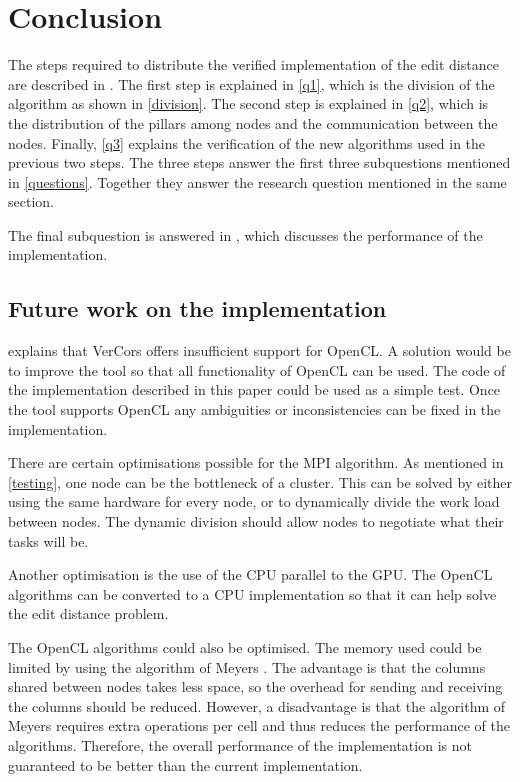 \section{Conclusion}
The steps required to distribute the verified implementation of the edit distance are described in .
The first step is explained in \cref{q1}, which is the division of the algorithm as shown in \cref{division}.
The second step is explained in \cref{q2}, which is the distribution of the pillars among nodes and the communication between the nodes.
Finally, \cref{q3} explains the verification of the new algorithms used in the previous two steps.
The three steps answer the first three subquestions mentioned in \cref{questions}.
Together they answer the research question mentioned in the same section.

The final subquestion is answered in , which discusses the performance of the implementation.

\subsection{Future work on the implementation} \label{future}
 explains that VerCors offers insufficient support for OpenCL.
A solution would be to improve the tool so that all functionality of OpenCL can be used.
The code of the implementation described in this paper could be used as a simple test.
Once the tool supports OpenCL any ambiguities or inconsistencies can be fixed in the implementation.

There are certain optimisations possible for the MPI algorithm.
As mentioned in \cref{testing}, one node can be the bottleneck of a cluster.
This can be solved by either using the same hardware for every node, or to dynamically divide the work load between nodes.
The dynamic division should allow nodes to negotiate what their tasks will be.

Another optimisation is the use of the CPU parallel to the GPU.
The OpenCL algorithms can be converted to a CPU implementation so that it can help solve the edit distance problem.

The OpenCL algorithms could also be optimised.
The memory used could be limited by using the algorithm of Meyers \cite{Meyers}.
The advantage is that the columns shared between nodes takes less space, so the overhead for sending and receiving the columns should be reduced.
However, a disadvantage is that the algorithm of Meyers requires extra operations per cell and thus reduces the performance of the algorithms.
Therefore, the overall performance of the implementation is not guaranteed to be better than the current implementation.
